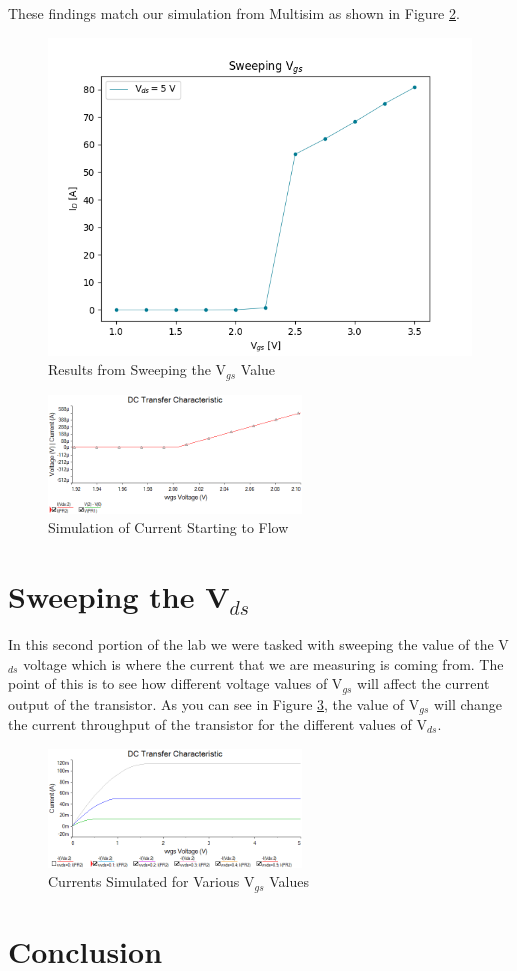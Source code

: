 \documentclass{article}
\begin{document}
These findings match our simulation from Multisim as shown in Figure 
\ref{simcurrentstarts}.
\begin{figure}[!htb]
  \begin{center}
    \includegraphics[width=.6\textwidth]{imgs/meas/sweepvds}
  \end{center}
  \caption{Results from Sweeping the V$_{gs}$ Value}
  \label{results1}
\end{figure}
\begin{figure}[!htb]
  \begin{center}
    \includegraphics[width=0.6\textwidth]{imgs/sim/Id vs Vgs current starts}
  \caption{Simulation of Current Starting to Flow}
  \label{simcurrentstarts}
  \end{center}

\end{figure}

\section{Sweeping the V$_{ds}$}
In this second portion of the lab we were tasked with 
sweeping the value of the V$_{ds}$ voltage which 
is where the current that we are measuring is coming from.
The point of this is to see how different voltage values of 
V$_{gs}$ will affect the current output of the transistor.
As you can see in Figure \ref{multiplecurrents}, the value of 
V$_{gs}$ will change the current throughput of the transistor 
for the different values of V$_{ds}$.

\begin{figure}[!htb]
  \begin{center}
    \includegraphics[width=0.6\textwidth]{imgs/sim/Id vs Vds}
  \caption{Currents Simulated for Various V$_{gs}$ Values}
  \label{multiplecurrents}
  \end{center}
\end{figure}
\section{Conclusion}
\end{document}
